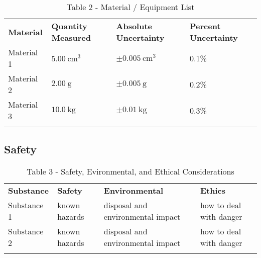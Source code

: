 \documentclass{lab}
\begin{document}
	\noindent\begin{minipage}{\textwidth}
        \vspace{-0.2cm}
        \renewcommand{\arraystretch}{1.1}
        \begin{table}[H]
            \centering
            \begin{tabular}{l|l|l|l}
                    \dtoprule
                    \textbf{Material}	& \textbf{Quantity Measured}	& \textbf{Absolute Uncertainty}	& \textbf{Percent Uncertainty}	\\
		    Material 1		& $\SI{5.00}{\cubic\cm}$	& $\pm\SI{0.005}{\cubic\cm}$	& 0.1\%				\\
		    Material 2		& $\SI{2.00}{\gram}$		& $\pm\SI{0.005}{\gram}$	& 0.2\%				\\
		    Material 3		& $\SI{10.0}{\kilo\gram}$	& $\pm\SI{0.01}{\kilo\gram}$	& 0.3\%				\\
                    \dbottomrule
            \end{tabular}
            \caption{Table 2 - Material / Equipment List}
            \label{table: materials}
        \end{table}
        \end{minipage}

	\noindent\begin{minipage}{\textwidth}
        \subsection*{Safety}
        \vspace{-0.2cm}
        \renewcommand{\arraystretch}{1.1}
        \begin{table}[H]
            \centering
            \begin{tabular}{l|l|l|l}
                    \dtoprule
		    \textbf{Substance}  & \textbf{Safety}		& \textbf{Environmental}		& \textbf{Ethics}			\\
                    Substance 1          & known hazards		        & disposal and environmental impact	& how to deal with danger	\\
                    
                    Substance 2          & known hazards		        & disposal and environmental impact	& how to deal with danger	\\
                    \dbottomrule
            \end{tabular}
	    \caption{Table 3 - Safety, Evironmental, and Ethical Considerations}
            \label{table: safety}
        \end{table}
        \end{minipage}
	
\end{document}
